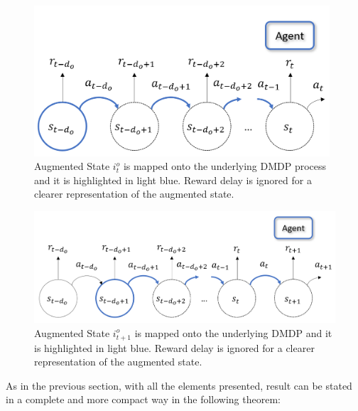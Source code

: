                 \begin{figure}[!b]
                    \centering
                    \includegraphics[width=11cm, keepaspectratio]{images/dmdp/augmented_i_o.png}
                    \caption{Augmented State $i_t^o$ is mapped onto the underlying DMDP process and it is highlighted in light blue. Reward delay is ignored for a clearer representation of the augmented state.}
                    \label{fig:augmented_i_o}
                \end{figure}
                \begin{figure}[!b]
                    \centering
                    \includegraphics[width=13cm, keepaspectratio]{images/dmdp/augmented_i_o_next.png}
                    \caption{Augmented State $i_{t+1}^o$ is mapped onto the underlying DMDP and it is highlighted in light blue. Reward delay is ignored for a clearer representation of the augmented state.}
                    \label{fig:augmented_i_o_next}
                \end{figure}
                \noindent
                As in the previous section, with all the elements presented,  result can be stated in a complete and more compact way in the following theorem:
                
